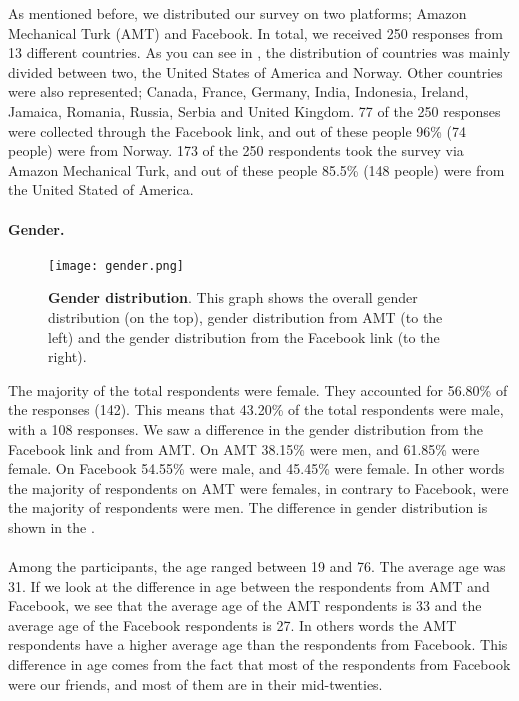 As mentioned before, we distributed our survey on two platforms; Amazon Mechanical Turk (AMT) and Facebook. In total, we received 250 responses from 13 different countries. As you can see in , the distribution of countries was mainly divided between two, the United States of America and Norway. Other countries were also represented; Canada, France, Germany, India, Indonesia, Ireland, Jamaica, Romania, Russia, Serbia and United Kingdom. 77 of the 250 responses were collected through the Facebook link, and out of these people 96\% (74 people) were from Norway. 173 of the 250 respondents took the survey via Amazon Mechanical Turk, and out of these people 85.5\% (148 people) were from the United Stated of America. 

\paragraph{Gender.}

\begin{figure}[h!]
\centering
\texttt{[image: gender.png]}
\caption[Gender distribution]{\textbf{Gender distribution}. This graph shows the overall gender distribution (on the top), gender distribution from AMT (to the left) and the gender distribution from the Facebook link (to the right).} 
\label{fig:gender}
\end{figure}

The majority of the total respondents were female. They accounted for 56.80\% of the responses (142). This means that 43.20\% of the total respondents were male, with a 108 responses. We saw a difference in the gender distribution from the Facebook link and from AMT. On AMT 38.15\% were men, and 61.85\% were female. On Facebook 54.55\% were male, and 45.45\% were female. In other words the majority of respondents on AMT were females, in contrary to Facebook, were the majority of respondents were men. The difference in gender distribution is shown in the .

\paragraph{}
Among the participants, the age ranged between 19 and 76. The average age was 31. If we look at the difference in age between the respondents from AMT and Facebook, we see that the average age of the AMT respondents is 33 and the average age of the Facebook respondents is 27. In others words the AMT respondents have a higher average age than the respondents from Facebook. This difference in age comes from the fact that most of the respondents from Facebook were our friends, and most of them are in their mid-twenties. 

